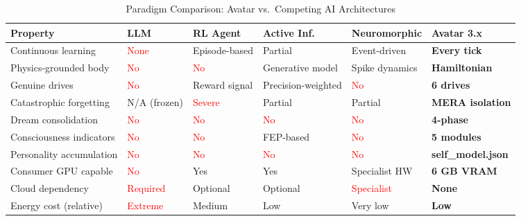 \documentclass[12pt,a4paper]{article}
\begin{document}
\begin{table}[H]
\centering
\caption{Paradigm Comparison: Avatar vs.\ Competing AI Architectures}
\label{tab:paradigm}
\small
\renewcommand{\arraystretch}{1.3}
\begin{tabularx}{\textwidth}{lXXXXX}
\toprule
\textbf{Property} & \textbf{LLM} & \textbf{RL Agent} & \textbf{Active Inf.} & \textbf{Neuromorphic} & \textbf{Avatar 3.x} \\
\midrule
Continuous learning & \textcolor{red}{None} & Episode-based & Partial & Event-driven & \textcolor{avatargreen}{\textbf{Every tick}} \\
\rowcolor{rowalt}
Physics-grounded body & \textcolor{red}{No} & \textcolor{red}{No} & Generative model & Spike dynamics & \textcolor{avatargreen}{\textbf{Hamiltonian}} \\
Genuine drives & \textcolor{red}{No} & Reward signal & Precision-weighted & \textcolor{red}{No} & \textcolor{avatargreen}{\textbf{6 drives}} \\
\rowcolor{rowalt}
Catastrophic forgetting & N/A (frozen) & \textcolor{red}{Severe} & Partial & Partial & \textcolor{avatargreen}{\textbf{MERA isolation}} \\
Dream consolidation & \textcolor{red}{No} & \textcolor{red}{No} & \textcolor{red}{No} & \textcolor{red}{No} & \textcolor{avatargreen}{\textbf{4-phase}} \\
\rowcolor{rowalt}
Consciousness indicators & \textcolor{red}{No} & \textcolor{red}{No} & FEP-based & \textcolor{red}{No} & \textcolor{avatargreen}{\textbf{5 modules}} \\
Personality accumulation & \textcolor{red}{No} & \textcolor{red}{No} & \textcolor{red}{No} & \textcolor{red}{No} & \textcolor{avatargreen}{\textbf{self\_model.json}} \\
\rowcolor{rowalt}
Consumer GPU capable & \textcolor{red}{No} & Yes & Yes & Specialist HW & \textcolor{avatargreen}{\textbf{6 GB VRAM}} \\
Cloud dependency & \textcolor{red}{Required} & Optional & Optional & \textcolor{red}{Specialist} & \textcolor{avatargreen}{\textbf{None}} \\
\rowcolor{rowalt}
Energy cost (relative) & \textcolor{red}{Extreme} & Medium & Low & Very low & \textcolor{avatargreen}{\textbf{Low}} \\
\bottomrule
\end{tabularx}
\end{table}

\end{document}
